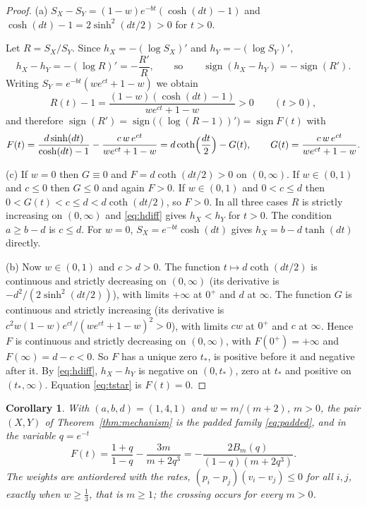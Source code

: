 \documentclass[10pt]{article}
\theoremstyle{plain}
\newtheorem{corollary}[theorem]{Corollary}
\theoremstyle{definition}
\theoremstyle{remark}
\DeclareMathOperator{\sign}{sign}
\begin{document}
\begin{proof}
(a) $S_X-S_Y=(1-w)e^{-bt}(\cosh(dt)-1)$ and $\cosh(dt)-1=2\sinh^2(dt/2)>0$ for $t>0$.

Let $R=S_X/S_Y$. Since $h_X=-(\log S_X)'$ and $h_Y=-(\log S_Y)'$,
\begin{equation}\label{eq:hdiff}
h_X-h_Y=-(\log R)'=-\frac{R'}{R},\qquad\text{so}\qquad \sign(h_X-h_Y)=-\sign(R').
\end{equation}
Writing $S_Y=e^{-bt}(we^{ct}+1-w)$ we obtain
\[
R(t)-1=\frac{(1-w)(\cosh(dt)-1)}{we^{ct}+1-w}>0\qquad(t>0),
\]
and therefore $\sign(R')=\sign\bigl((\log(R-1))'\bigr)=\sign F(t)$ with
\[
F(t)=\frac{d\sinh(dt)}{\cosh(dt)-1}-\frac{c\,w\,e^{ct}}{we^{ct}+1-w}
=d\coth\Bigl(\frac{dt}{2}\Bigr)-G(t),\qquad G(t)=\frac{c\,w\,e^{ct}}{we^{ct}+1-w} .
\]

(c) If $w=0$ then $G\equiv 0$ and $F=d\coth(dt/2)>0$ on $(0,\infty)$. If $w\in(0,1)$ and $c\le 0$ then $G\le 0$ and again $F>0$. If $w\in(0,1)$ and $0<c\le d$ then $0<G(t)<c\le d<d\coth(dt/2)$, so $F>0$. In all three cases $R$ is strictly increasing on $(0,\infty)$ and \eqref{eq:hdiff} gives $h_X<h_Y$ for $t>0$. The condition $a\ge b-d$ is $c\le d$. For $w=0$, $S_X=e^{-bt}\cosh(dt)$ gives $h_X=b-d\tanh(dt)$ directly.

(b) Now $w\in(0,1)$ and $c>d>0$. The function $t\mapsto d\coth(dt/2)$ is continuous and strictly decreasing on $(0,\infty)$ (its derivative is $-d^2/(2\sinh^2(dt/2))$), with limits $+\infty$ at $0^+$ and $d$ at $\infty$. The function $G$ is continuous and strictly increasing (its derivative is $c^2w(1-w)e^{ct}/(we^{ct}+1-w)^2>0$), with limits $cw$ at $0^+$ and $c$ at $\infty$. Hence $F$ is continuous and strictly decreasing on $(0,\infty)$, with $F(0^+)=+\infty$ and $F(\infty)=d-c<0$. So $F$ has a unique zero $t_*$, is positive before it and negative after it. By \eqref{eq:hdiff}, $h_X-h_Y$ is negative on $(0,t_*)$, zero at $t_*$ and positive on $(t_*,\infty)$. Equation \eqref{eq:tstar} is $F(t)=0$.
\end{proof}

\begin{corollary}\label{cor:specialise}
With $(a,b,d)=(1,4,1)$ and $w=m/(m+2)$, $m>0$, the pair $(X,Y)$ of Theorem~\ref{thm:mechanism} is the padded family \eqref{eq:padded}, and in the variable $q=e^{-t}$
\[
F(t)=\frac{1+q}{1-q}-\frac{3m}{m+2q^3}=-\frac{2B_m(q)}{(1-q)(m+2q^3)} .
\]
The weights are antiordered with the rates, $(p_i-p_j)(v_i-v_j)\le 0$ for all $i,j$, exactly when $w\ge\tfrac13$, that is $m\ge 1$; the crossing occurs for every $m>0$.
\end{corollary}
\end{document}

